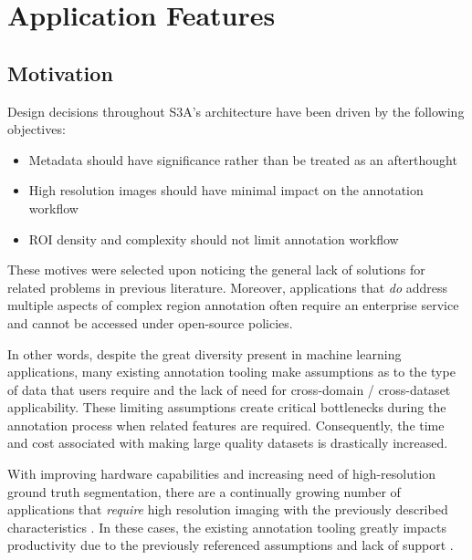 \section{Application Features}\label{sec:appFeatures}

\subsection{Motivation}\label{sec:motivation}
Design decisions throughout S3A's architecture have been driven by the following objectives:

\begin{itemize}
    \item Metadata should have significance rather than be treated as an afterthought
    \item High resolution images should have minimal impact on the annotation workflow
    \item ROI density and complexity should not limit annotation workflow
\end{itemize}

These motives were selected upon noticing the general lack of solutions for related problems in previous literature. Moreover, applications that \emph{do} address multiple aspects of complex region annotation often require an enterprise service and cannot be accessed under open-source policies.

In other words, despite the great diversity present in machine learning applications, many existing annotation tooling make assumptions as to the type of data that users require and the lack of need for cross-domain / cross-dataset applicability.
These limiting assumptions create critical bottlenecks during the annotation process when related features are required.
Consequently, the time and cost associated with making large quality datasets is drastically increased.

With improving hardware capabilities and increasing need of high-resolution ground truth segmentation, there are a continually growing number of applications that \textit{require} high resolution imaging with the previously described characteristics \cite{Mohajerani_cloudRemoteSensing,Demochkina_improvingOneShotXray}.
In these cases, the existing annotation tooling greatly impacts productivity due to the previously referenced assumptions and lack of support \cite{SpaceNet2020-lb}.


